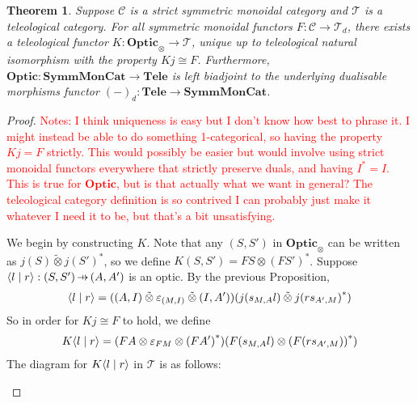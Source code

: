 \documentclass[11pt,letterpaper]{article}
\theoremstyle{plain}
\newtheorem{theorem}{Theorem}[subsection]
\theoremstyle{definition}
\newcommand{\C}{\mathscr{C}}
\newcommand{\T}{\mathscr{T}}
\newcommand{\SymmMonCat}{\mathbf{SymmMonCat}}
\newcommand{\Tele}{\mathbf{Tele}}
\newcommand{\Optic}{\mathbf{Optic}}
\newcommand{\switched}{\mathbin{\tilde{\otimes}}}
\newcommand{\rep}[2]{{\ensuremath \left\langle #1 \mid #2 \right\rangle}}
\newcommand{\hto}{\ensuremath{\,\mathaccent\shortmid\rightarrow\,}}
\newcommand{\todo}[1]{\textcolor{red}{\small #1}}
\begin{document}
\begin{theorem}\label{optic-is-free-teleological-cat}
  Suppose $\C$ is a strict symmetric monoidal category and $\T$ is a teleological category. For all symmetric monoidal functors $F : \C \to \T_d$, there exists a teleological functor $K : \Optic_\otimes \to \T$, unique up to teleological natural isomorphism with the property $Kj \cong F$.
  Furthermore, $\Optic : \SymmMonCat \to \Tele$ is left biadjoint to the underlying dualisable morphisms functor ${(-)}_d : \Tele \to \SymmMonCat$.
\end{theorem}
\begin{proof}
  \todo{Notes: I think uniqueness is easy but I don't know how best to phrase it. I might instead be able to do something 1-categorical, so having the property $Kj = F$ strictly. This would possibly be easier but would involve using strict monoidal functors everywhere that strictly preserve duals, and having $I^* = I$. This is true for $\Optic$, but is that actually what we want in general? The teleological category definition is so contrived I can probably just make it whatever I need it to be, but that's a bit unsatisfying.}

  We begin by constructing $K$. Note that any $(S, S')$ in $\Optic_\otimes$ can be written as $j(S) \switched {j(S')}^*$, so we define $K(S, S') = FS \otimes {(FS')}^*$. Suppose $\rep{l}{r} : (S, S') \hto (A, A')$ is an optic. By the previous Proposition,
  \begin{align*}
    \rep{l}{r} = ((A, I) \switched \varepsilon_{(M, I)} \switched (I, A'))(j(s_{M,A}l) \switched {j(rs_{A', M})}^*)
  \end{align*}
  So in order for $Kj \cong F$ to hold, we define
  \begin{align*}
    K\rep{l}{r} = (FA \otimes \varepsilon_{FM} \otimes {(FA')}^*)(F(s_{M,A}l) \otimes {(F(rs_{A', M}))}^* )
  \end{align*}
  The diagram for $K\rep{l}{r}$ in $\T$ is as follows:
  \begin{center}
    
  \end{center}


\end{proof}
\end{document}
